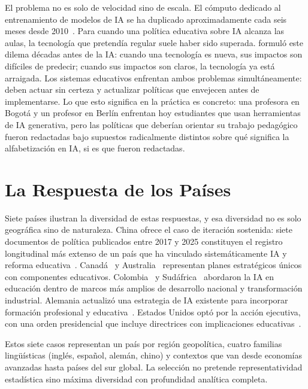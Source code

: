 El problema no es solo de velocidad sino de escala. El cómputo dedicado al entrenamiento de modelos de IA se ha duplicado aproximadamente cada seis meses desde 2010~\citep{sevilla2022compute}. Para cuando una política educativa sobre IA alcanza las aulas, la tecnología que pretendía regular suele haber sido superada. \citet{collingridge1980social} formuló este dilema décadas antes de la IA: cuando una tecnología es nueva, sus impactos son difíciles de predecir; cuando sus impactos son claros, la tecnología ya está arraigada. Los sistemas educativos enfrentan ambos problemas simultáneamente: deben actuar sin certeza y actualizar políticas que envejecen antes de implementarse. Lo que esto significa en la práctica es concreto: una profesora en Bogotá y un profesor en Berlín enfrentan hoy estudiantes que usan herramientas de IA generativa, pero las políticas que deberían orientar su trabajo pedagógico fueron redactadas bajo supuestos radicalmente distintos sobre qué significa la alfabetización en IA, si es que fueron redactadas.


\section{La Respuesta de los Países}
\label{sec:respuesta-paises}

Siete países ilustran la diversidad de estas respuestas, y esa diversidad no es solo geográfica sino de naturaleza. China ofrece el caso de iteración sostenida: siete documentos de política publicados entre 2017 y 2025 constituyen el registro longitudinal más extenso de un país que ha vinculado sistemáticamente IA y reforma educativa~\citep{china2017ai}. Canadá~\citep{canada2017ai} y Australia~\citep{australia2021aiaction} representan planes estratégicos únicos con componentes educativos. Colombia~\citep{colombia2019conpes} y Sudáfrica~\citep{southafrica2020pc4ir} abordaron la IA en educación dentro de marcos más amplios de desarrollo nacional y transformación industrial. Alemania actualizó una estrategia de IA existente para incorporar formación profesional y educativa~\citep{germany2020aiupdate}. Estados Unidos optó por la acción ejecutiva, con una orden presidencial que incluye directrices con implicaciones educativas~\citep{whitehouse2023aeo}.

Estos siete casos representan un país por región geopolítica, cuatro familias lingüísticas (inglés, español, alemán, chino) y contextos que van desde economías avanzadas hasta países del sur global. La selección no pretende representatividad estadística sino máxima diversidad con profundidad analítica completa.


